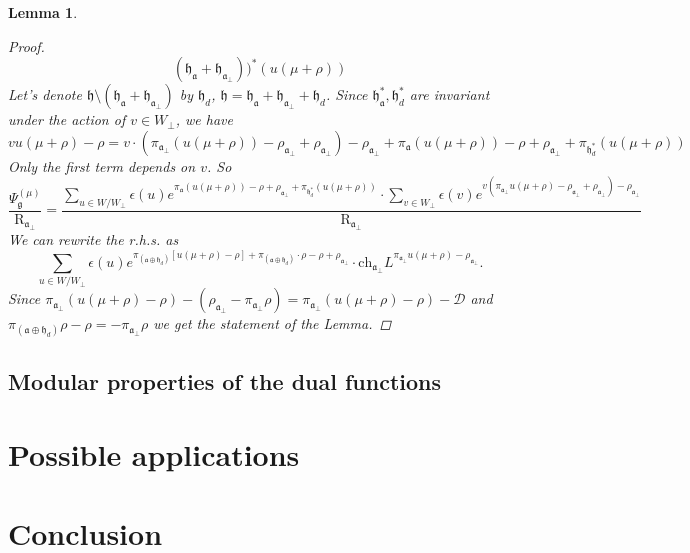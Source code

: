 \documentclass[a4paper,12pt]{article}
\newtheorem{lemma}{Lemma}
\theoremstyle{definition}
\theoremstyle{definition}
\theoremstyle{definition}
\newcommand{\pia}{\pi_{\mathfrak{a}}}
\newcommand{\piab}{\pi_{\mathfrak{a}_{\bot}}}
\newcommand{\af}{\mathfrak{a}}
\newcommand{\afb}{\mathfrak{a}_{\bot}}
\begin{document}
\begin{lemma}
\begin{proof}
\begin{equation}
{      (\mathfrak{h}_{\af}+\mathfrak{h}_{\af_{\bot}}))^*}(u(\mu+\rho))
  \end{equation}
  Let's denote $\mathfrak{h}\setminus (\mathfrak{h}_{\af}+\mathfrak{h}_{\af_{\bot}})$ by $\mathfrak{h}_d$,
  $\mathfrak{h}=\mathfrak{h}_{\af}+\mathfrak{h}_{\af_{\bot}}+\mathfrak{h}_d$. Since $\mathfrak{h}_{\af}^*,\mathfrak{h}_d^*$ are invariant under the action of $v\in W_{\bot}$, we have
  \begin{equation}
    \label{eq:8}
    vu(\mu+\rho)-\rho=v\cdot(\piab(u(\mu+\rho))-\rho_{\afb}+\rho_{\afb})-\rho_{\afb}+\pia(u(\mu+\rho))-\rho+\rho_{\afb}+\pi_{\mathfrak{h}_d^*}(u(\mu+\rho))
  \end{equation}
  Only the first term depends on $v$. So
  \begin{equation}
    \label{eq:9}
    \frac{\Psi^{(\mu)}_{\mathfrak{g}}}{\mathrm{R}_{\afb}}=
    \frac{\sum_{u\in W/W_{\bot}}\epsilon(u)e^{\pia(u(\mu+\rho))-\rho+\rho_{\afb}+\pi_{\mathfrak{h}_d^*}(u(\mu+\rho))}\cdot
      \sum_{v\in W_{\bot}}\epsilon(v)e^{v(\piab u(\mu+\rho)-\rho_{\afb}+\rho_{\afb})-\rho_{\afb}}}{\mathrm{R}_{\afb}}
  \end{equation}
  We can rewrite the r.h.s. as
  \begin{equation}
    \label{eq:10}
    \sum_{u\in W/W_{\bot}}\epsilon(u)e^{\pi_{(\af\oplus\mathfrak{h}_d)}\left[u(\mu+\rho)-\rho\right]+\pi_{(\af\oplus \mathfrak{h}_d)}\cdot \rho-\rho+\rho_{\afb}}\cdot
    \mathrm{ch}_{\afb}L^{\pi_{\afb}u(\mu+\rho)-\rho_{\afb}}.
  \end{equation}
  Since $\pi_{\afb}(u(\mu+\rho)-\rho)-(\rho_{\afb}-\pi_{\afb}\rho)=\pi_{\afb}(u(\mu+\rho)-\rho)-\mathcal{D}$ and $\pi_{(\af\oplus\mathfrak{h}_d)}\rho-\rho=-\pi_{\afb}\rho$ we get the statement of the Lemma.

\end{proof}
\end{lemma}
\subsection{Modular properties of the dual functions}
\label{sec:modul-prop-dual}

\section{Possible applications}
\label{sec:poss-appl}

\section{Conclusion}
\label{sec:conclusion}



{}

\end{document}

